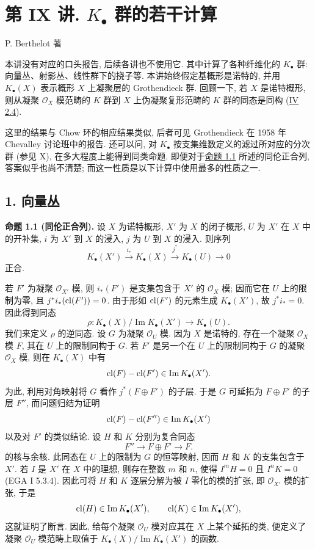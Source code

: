 \section*{第 IX 讲. $K_\bullet$ 群的若干计算}
\begin{center}
P. Berthelot 著
\end{center}

本讲没有对应的口头报告, 后续各讲也不使用它. 其中计算了各种纤维化的 $K_\bullet$ 群: 向量丛、射影丛、线性群下的挠子等. 本讲始终假定基概形是诺特的, 并用 $K_\bullet(X)$ 表示概形 $X$ 上凝聚层的 Grothendieck 群. 回顾一下, 若 $X$ 是诺特概形, 则从凝聚 $\mathcal O_X$ 模范畴的 $K$ 群到 $X$ 上伪凝聚复形范畴的 $K$ 群的同态是同构 (\hyperlink{sga6.e04.para.2-4}{IV 2.4}).

这里的结果与 Chow 环的相应结果类似, 后者可见 Grothendieck 在 1958 年 Chevalley 讨论班中的报告. 还可以问, 对 $K_\bullet$ 按支集维数定义的滤过所对应的分次群 (参见 X), 在多大程度上能得到同类命题. 即便对于\hyperlink{sga6.e09.prop.1-1}{命题 1.1} 所述的同伦正合列, 答案似乎也尚不清楚; 而这一性质是以下计算中使用最多的性质之一.

\subsection*{1. 向量丛}

\textbf{命题 1.1 (同伦正合列).} 设 $X$ 为诺特概形, $X'$ 为 $X$ 的闭子概形, $U$ 为 $X'$ 在 $X$ 中的开补集, $i$ 为 $X'$ 到 $X$ 的浸入, $j$ 为 $U$ 到 $X$ 的浸入. 则序列
\[
 K_\bullet(X')\xrightarrow{i_*}K_\bullet(X)\xrightarrow{j^*}K_\bullet(U)\longrightarrow 0
\]
正合.

若 $F'$ 为凝聚 $\mathcal O_{X'}$ 模, 则 $i_*(F')$ 是支集包含于 $X'$ 的 $\mathcal O_X$ 模; 因而它在 $U$ 上的限制为零, 且 $j^*i_*(\operatorname{cl}(F'))=0$. 由于形如 $\operatorname{cl}(F')$ 的元素生成 $K_\bullet(X')$, 故 $j^*i_*=0$. 因此得到同态
\[
 \rho:K_\bullet(X)/\operatorname{Im}K_\bullet(X')\longrightarrow K_\bullet(U).
\]
我们来定义 $\rho$ 的逆同态. 设 $G$ 为凝聚 $\mathcal O_U$ 模. 因为 $X$ 是诺特的, 存在一个凝聚 $\mathcal O_X$ 模 $F$, 其在 $U$ 上的限制同构于 $G$. 若 $F'$ 是另一个在 $U$ 上的限制同构于 $G$ 的凝聚 $\mathcal O_X$ 模, 则在 $K_\bullet(X)$ 中有
\[
 \operatorname{cl}(F)-\operatorname{cl}(F')\in \operatorname{Im}K_\bullet(X').
\]
为此, 利用对角映射将 $G$ 看作 $j^*(F\oplus F')$ 的子层. 于是 $G$ 可延拓为 $F\oplus F'$ 的子层 $F''$, 而问题归结为证明
\[
 \operatorname{cl}(F)-\operatorname{cl}(F'')\in \operatorname{Im}K_\bullet(X')
\]
以及对 $F'$ 的类似结论. 设 $H$ 和 $K$ 分别为复合同态
\[
 F''\longrightarrow F\oplus F'\longrightarrow F.
\]
的核与余核. 此同态在 $U$ 上的限制为 $G$ 的恒等映射, 因而 $H$ 和 $K$ 的支集包含于 $X'$. 若 $I$ 是 $X'$ 在 $X$ 中的理想, 则存在整数 $m$ 和 $n$, 使得 $I^mH=0$ 且 $I^nK=0$ (EGA I 5.3.4). 因此可将 $H$ 和 $K$ 逐层分解为被 $I$ 零化的模的扩张, 即 $\mathcal O_{X'}$ 模的扩张, 于是
\[
 \operatorname{cl}(H)\in\operatorname{Im}K_\bullet(X'),\qquad \operatorname{cl}(K)\in\operatorname{Im}K_\bullet(X'),
\]
这就证明了断言. 因此, 给每个凝聚 $\mathcal O_U$ 模对应其在 $X$ 上某个延拓的类, 便定义了凝聚 $\mathcal O_U$ 模范畴上取值于 $K_\bullet(X)/\operatorname{Im}K_\bullet(X')$ 的函数.

